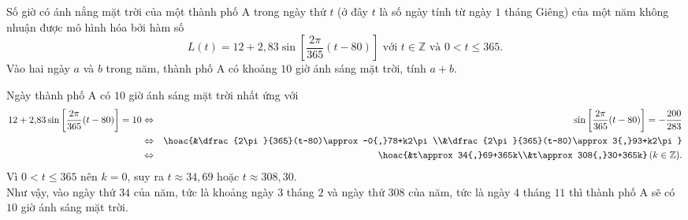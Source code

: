 \begin{ex}
\begin{center}
\begin{tikzpicture}[scale=1, line join=round, line cap=round, >=stealth]
		\end{tikzpicture}
	\end{center}
\end{ex}

\begin{ex}%
	Số giờ có ánh nắng mặt trời của một thành phố A trong ngày thứ $t$ (ở đây $t$ là số ngày tính từ ngày $1$ tháng Giêng) của một năm không nhuận được mô hình hóa bởi hàm số
	$$L(t)=12+2{,}83\sin\left[\dfrac{2\pi}{365}(t-80)\right]\text{ với } t\in \mathbb{Z} \text{ và } 0<t\le 365.$$
	Vào hai  ngày $a$ và $b$ trong năm, thành phố A có khoảng $10$ giờ ánh sáng mặt trời, tính $a+b$.
	
	\loigiai 
	{Ngày thành phố A có $10$ giờ ánh sáng mặt trời nhất ứng với 
		\allowdisplaybreaks
		\begin{eqnarray*}
			12+2{,}83\sin\left[\dfrac{2\pi}{365}(t-80)\right]=10&\Leftrightarrow&\sin\left[\dfrac{2\pi}{365}(t-80)\right]=-\dfrac{200}{283}\\
			&\Leftrightarrow&\hoac{&\dfrac{2\pi}{365}(t-80)\approx -0{,}78+k2\pi\\&\dfrac{2\pi}{365}(t-80)\approx 3{,}93+k2\pi}\\
			&\Leftrightarrow&\hoac{&t\approx 34{,}69+365k\\&t\approx 308{,}30+365k}\,(k\in\mathbb{Z}).
		\end{eqnarray*}
		Vì $0<t\le 365$ nên $k=0$, suy ra $t\approx 34{,}69$ hoặc $t\approx 308{,}30$.\\
		Như vậy, vào ngày thứ $34$ của năm, tức là khoảng ngày $3$ tháng $2$ và ngày thứ $308$ của năm, tức là ngày $4$ tháng $11$ thì thành phố A sẽ có $10$ giờ ánh sáng mặt trời.	
	}
\end{ex}

